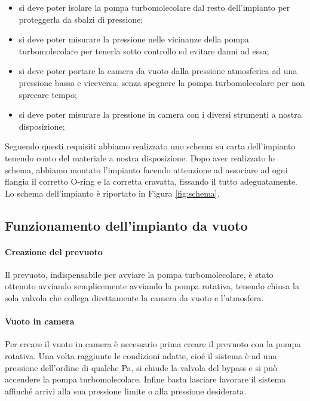 \begin{itemize}
	\item{si deve poter isolare la pompa turbomolecolare dal resto dell'impianto per proteggerla da sbalzi di pressione;}
	\item{si deve poter misurare la pressione nelle vicinanze della pompa turbomolecolare per tenerla sotto controllo ed evitare danni ad essa;}	
	\item{si deve poter portare la camera da vuoto dalla pressione atmosferica ad una pressione bassa e viceversa, senza spegnere la pompa turbomolecolare per non sprecare tempo;}
	\item{si deve poter misurare la pressione in camera con i diversi strumenti a nostra disposizione;}
\end{itemize}

Seguendo questi requisiti abbiamo realizzato uno schema su carta dell'impianto tenendo conto del materiale a nostra disposizione. Dopo aver realizzato lo schema, abbiamo montato l'impianto facendo attenzione ad associare ad ogni flangia il corretto O-ring e la corretta cravatta, fissando il tutto adeguatamente. Lo schema dell'impianto è riportato in Figura \ref{fig:schema}.

\subsection{Funzionamento dell'impianto da vuoto}
\paragraph{Creazione del prevuoto\\}
Il prevuoto, indispensabile per avviare la pompa turbomolecolare, è stato ottenuto avviando semplicemente avviando la pompa rotativa, tenendo chiusa la sola valvola che collega direttamente la camera da vuoto e l'atmosfera.
\paragraph{Vuoto in camera\\}
Per creare il vuoto in camera è necessario prima creare il prevuoto con la pompa rotativa. Una volta raggiunte le condizioni adatte, cioé il sistema è ad una pressione dell'ordine di qualche \si{\Pa}, si chiude la valvola del bypass e si può accendere la pompa turbomolecolare. Infine basta lasciare lavorare il sistema affinché arrivi alla sua pressione limite o alla pressione desiderata. %
